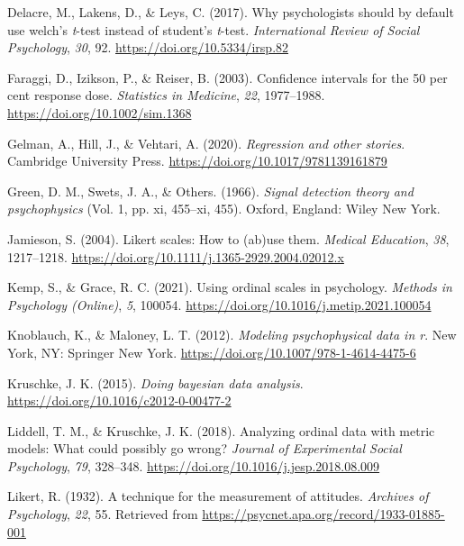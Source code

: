 \documentclass[
  man,floatsintext]{apa6}
\newlength{\cslhangindent}
\newenvironment{CSLReferences}[2] %
 {\begin{list}{}{%
  \setlength{\itemindent}{0pt}
  \setlength{\leftmargin}{0pt}
  \setlength{\parsep}{0pt}
  \ifodd #1
   \setlength{\leftmargin}{\cslhangindent}
   \setlength{\itemindent}{-1\cslhangindent}
  \fi
  \setlength{\itemsep}{#2\baselineskip}}}
 {\end{list}}
\begin{document}
\begin{CSLReferences}{1}{0}
Delacre, M., Lakens, D., \& Leys, C. (2017). Why psychologists should by default use welch's \emph{t}-test instead of student's \emph{t}-test. \emph{International Review of Social Psychology}, \emph{30}, 92. \url{https://doi.org/10.5334/irsp.82}

Faraggi, D., Izikson, P., \& Reiser, B. (2003). Confidence intervals for the 50 per cent response dose. \emph{Statistics in Medicine}, \emph{22}, 1977--1988. \url{https://doi.org/10.1002/sim.1368}

Gelman, A., Hill, J., \& Vehtari, A. (2020). \emph{Regression and other stories}. Cambridge University Press. \url{https://doi.org/10.1017/9781139161879}

Green, D. M., Swets, J. A., \& Others. (1966). \emph{Signal detection theory and psychophysics} (Vol. 1, pp. xi, 455--xi, 455). Oxford, England: Wiley New York.

Jamieson, S. (2004). Likert scales: How to (ab)use them. \emph{Medical Education}, \emph{38}, 1217--1218. \url{https://doi.org/10.1111/j.1365-2929.2004.02012.x}

Kemp, S., \& Grace, R. C. (2021). Using ordinal scales in psychology. \emph{Methods in Psychology (Online)}, \emph{5}, 100054. \url{https://doi.org/10.1016/j.metip.2021.100054}

Knoblauch, K., \& Maloney, L. T. (2012). \emph{Modeling psychophysical data in r}. New York, NY: Springer New York. \url{https://doi.org/10.1007/978-1-4614-4475-6}

Kruschke, J. K. (2015). \emph{Doing bayesian data analysis}. \url{https://doi.org/10.1016/c2012-0-00477-2}

Liddell, T. M., \& Kruschke, J. K. (2018). Analyzing ordinal data with metric models: What could possibly go wrong? \emph{Journal of Experimental Social Psychology}, \emph{79}, 328--348. \url{https://doi.org/10.1016/j.jesp.2018.08.009}

Likert, R. (1932). A technique for the measurement of attitudes. \emph{Archives of Psychology}, \emph{22}, 55. Retrieved from \url{https://psycnet.apa.org/record/1933-01885-001}


\end{CSLReferences}
\end{document}

